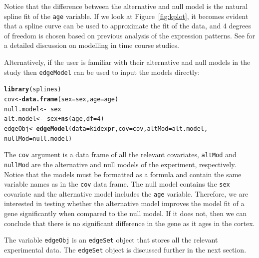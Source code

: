 \documentclass{article}\usepackage[]{graphicx}\usepackage[]{color}
\makeatletter
\newcommand{\hlnum}[1]{\textcolor[rgb]{0.686,0.059,0.569}{#1}}%
\newcommand{\hlopt}[1]{\textcolor[rgb]{0,0,0}{#1}}%
\newcommand{\hlstd}[1]{\textcolor[rgb]{0.345,0.345,0.345}{#1}}%
\newcommand{\hlkwb}[1]{\textcolor[rgb]{0.69,0.353,0.396}{#1}}%
\newcommand{\hlkwc}[1]{\textcolor[rgb]{0.333,0.667,0.333}{#1}}%
\newcommand{\hlkwd}[1]{\textcolor[rgb]{0.737,0.353,0.396}{\textbf{#1}}}%
\newenvironment{kframe}{%
 \def\at@end@of@kframe{}%
 \ifinner\ifhmode%
  \def\at@end@of@kframe{\end{minipage}}%
  \begin{minipage}{\columnwidth}%
 \fi\fi%
 \def\FrameCommand##1{\hskip\@totalleftmargin \hskip-\fboxsep
 \colorbox{shadecolor}{##1}\hskip-\fboxsep
     \hskip-\linewidth \hskip-\@totalleftmargin \hskip\columnwidth}%
 \MakeFramed {\advance\hsize-\width
   \@totalleftmargin\z@ \linewidth\hsize
   \@setminipage}}%
 {\par\unskip\endMakeFramed%
 \at@end@of@kframe}
\newenvironment{knitrout}{}{} %
\makeatother
\begin{document}
Notice that the difference between the alternative and null model is the  natural spline fit of the {\tt age} variable. If we look at Figure~\ref{fig:kplot}, it becomes evident that a spline curve can be used to approximate the fit of the data, and 4 degrees of freedom is chosen based on previous analysis of the expression patterns. See \cite{storey:2005} for a detailed discussion on modelling in time course studies. 

Alternatively, if the user is familiar with their alternative and null models in the study then {\tt edgeModel} can be used to input the models directly:
\begin{knitrout}
\color{fgcolor}\begin{kframe}
\begin{alltt}
\hlkwd{library}\hlstd{(splines)}
\hlstd{cov} \hlkwb{<-} \hlkwd{data.frame}\hlstd{(}\hlkwc{sex} \hlstd{= sex,} \hlkwc{age} \hlstd{= age)}
\hlstd{null.model} \hlkwb{<-} \hlopt{~}\hlstd{sex}
\hlstd{alt.model} \hlkwb{<-} \hlopt{~}\hlstd{sex} \hlopt{+} \hlkwd{ns}\hlstd{(age,} \hlkwc{df} \hlstd{=} \hlnum{4}\hlstd{)}
\hlstd{edgeObj} \hlkwb{<-} \hlkwd{edgeModel}\hlstd{(}\hlkwc{data} \hlstd{= kidexpr,} \hlkwc{cov} \hlstd{= cov,} \hlkwc{altMod} \hlstd{= alt.model,}
    \hlkwc{nullMod} \hlstd{= null.model)}
\end{alltt}
\end{kframe}
\end{knitrout}

The {\tt cov} argument is a data frame of all the relevant covariates, {\tt altMod} and {\tt nullMod} are the alternative and null models of the experiment, respectively. Notice that the models must be formatted as a formula and contain the same variable names as in the {\tt cov} data frame. The null model contains the {\tt sex} covariate and the alternative model includes the {\tt age} variable. Therefore, we are interested in testing whether the alternative model improves the model fit of a gene significantly when compared to the null model. If it does not, then we can conclude that there is no significant difference in the gene as it ages in the cortex. 

The variable {\tt edgeObj} is an {\tt edgeSet} object that stores all the relevant experimental data. The {\tt edgeSet} object is discussed further in the next section. 
\end{document}
